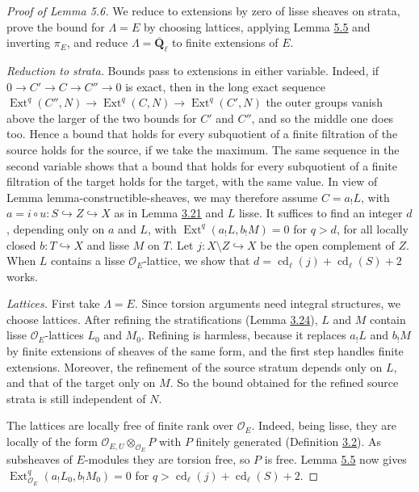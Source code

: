 \documentclass[11pt]{article}
\providecommand{\Ext}{}\renewcommand{\Ext}{\operatorname{Ext}}
\begin{document}
\begin{proof}[{Proof of Lemma 5.6}]\label{bp428}%
We reduce to extensions by zero of lisse sheaves on strata, prove the bound for \(\Lambda=E\) by choosing lattices, applying Lemma \hyperref[bp424]{5.5} and inverting \(\pi_E\), and reduce \(\Lambda=\overline{\mathbf Q}_\ell\) to finite extensions of \(E\).

\emph{Reduction to strata.} Bounds pass to extensions in either variable. Indeed, if \(0\to C'\to C\to C''\to0\) is exact, then in the long exact sequence \(\Ext^q(C'',N)\to\Ext^q(C,N)\to\Ext^q(C',N)\) the outer groups vanish above the larger of the two bounds for \(C'\) and \(C''\), and so the middle one does too. Hence a bound that holds for every subquotient of a finite filtration of the source holds for the source, if we take the maximum. The same sequence in the second variable shows that a bound that holds for every subquotient of a finite filtration of the target holds for the target, with the same value. In view of Lemma lemma-constructible-sheaves, we may therefore assume \(C=a_!L\), with \(a=i\circ u:S\hookrightarrow Z\hookrightarrow X\) as in Lemma \hyperref[bp257]{3.21} and \(L\) lisse. It suffices to find an integer \(d\), depending only on \(a\) and \(L\), with \(\Ext^q(a_!L,b_!M)=0\) for \(q>d\), for all locally closed \(b:T\hookrightarrow X\) and lisse \(M\) on \(T\). Let \(j:X\setminus Z\hookrightarrow X\) be the open complement of \(Z\). When \(L\) contains a lisse \(\mathcal O_E\)-lattice, we show that \(d=\operatorname{cd}_\ell(j)+\operatorname{cd}_\ell(S)+2\) works.

\emph{Lattices.} First take \(\Lambda=E\). Since torsion arguments need integral structures, we choose lattices. After refining the stratifications (Lemma \hyperref[bp269]{3.24}), \(L\) and \(M\) contain lisse \(\mathcal O_E\)-lattices \(L_0\) and \(M_0\). Refining is harmless, because it replaces \(a_!L\) and \(b_!M\) by finite extensions of sheaves of the same form, and the first step handles finite extensions. Moreover, the refinement of the source stratum depends only on \(L\), and that of the target only on \(M\). So the bound obtained for the refined source strata is still independent of \(N\).

The lattices are locally free of finite rank over \(\mathcal O_E\). Indeed, being lisse, they are locally of the form \(\mathcal O_{E,U}\otimes_{\mathcal O_E}P\) with \(P\) finitely generated (Definition \hyperref[bp201]{3.2}). As subsheaves of \(E\)-modules they are torsion free, so \(P\) is free. Lemma \hyperref[bp424]{5.5} now gives \(\Ext^q_{\mathcal O_E}(a_!L_0,b_!M_0)=0\) for \(q>\operatorname{cd}_\ell(j)+\operatorname{cd}_\ell(S)+2\).


\end{proof}
\end{document}
